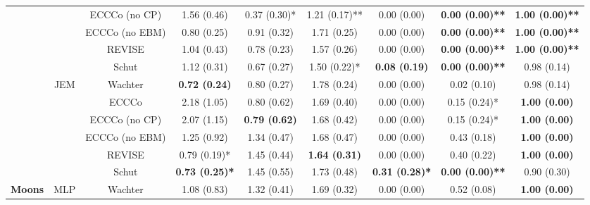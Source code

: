 \begin{table}
{\begin{tabular}[t]{>{}c|c|c|c|c|c|c|c|c}
 &  & ECCCo (no CP) & 1.56 (0.46) & 0.37 (0.30)* & 1.21 (0.17)** & 0.00 (0.00) & \textbf{0.00 (0.00)**} & \textbf{1.00 (0.00)**}\\

 &  & ECCCo (no EBM) & 0.80 (0.25) & 0.91 (0.32) & 1.71 (0.25) & 0.00 (0.00) & \textbf{0.00 (0.00)**} & \textbf{1.00 (0.00)**}\\

 &  & REVISE & 1.04 (0.43) & 0.78 (0.23) & 1.57 (0.26) & 0.00 (0.00) & \textbf{0.00 (0.00)**} & \textbf{1.00 (0.00)**}\\

 &  & Schut & 1.12 (0.31) & 0.67 (0.27) & 1.50 (0.22)* & \textbf{0.08 (0.19)} & \textbf{0.00 (0.00)**} & 0.98 (0.14)\\

 & \multirow{-6}{*}{\centering\arraybackslash JEM} & Wachter & \textbf{0.72 (0.24)} & 0.80 (0.27) & 1.78 (0.24) & 0.00 (0.00) & 0.02 (0.10) & 0.98 (0.14)\\
\cline{2-9}
 &  & ECCCo & 2.18 (1.05) & 0.80 (0.62) & 1.69 (0.40) & 0.00 (0.00) & 0.15 (0.24)* & \textbf{1.00 (0.00)}\\

 &  & ECCCo (no CP) & 2.07 (1.15) & \textbf{0.79 (0.62)} & 1.68 (0.42) & 0.00 (0.00) & 0.15 (0.24)* & \textbf{1.00 (0.00)}\\

 &  & ECCCo (no EBM) & 1.25 (0.92) & 1.34 (0.47) & 1.68 (0.47) & 0.00 (0.00) & 0.43 (0.18) & \textbf{1.00 (0.00)}\\

 &  & REVISE & 0.79 (0.19)* & 1.45 (0.44) & \textbf{1.64 (0.31)} & 0.00 (0.00) & 0.40 (0.22) & \textbf{1.00 (0.00)}\\

 &  & Schut & \textbf{0.73 (0.25)*} & 1.45 (0.55) & 1.73 (0.48) & \textbf{0.31 (0.28)*} & \textbf{0.00 (0.00)**} & 0.90 (0.30)\\

\multirow{-12}{*}{\centering\arraybackslash \textbf{Moons}} & \multirow{-6}{*}{\centering\arraybackslash MLP} & Wachter & 1.08 (0.83) & 1.32 (0.41) & 1.69 (0.32) & 0.00 (0.00) & 0.52 (0.08) & \textbf{1.00 (0.00)}\\
\hline
\end{tabular}}
\end{table}
